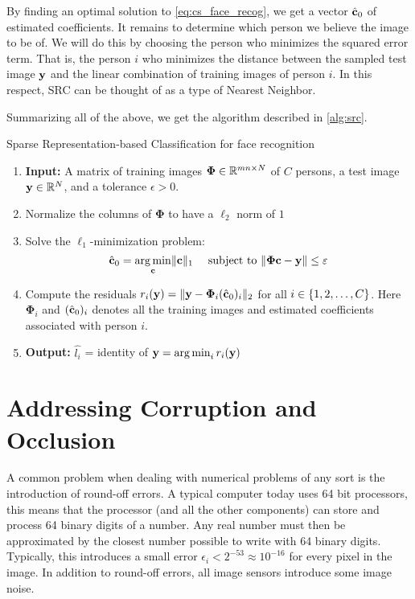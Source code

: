 By finding an optimal solution to \eqref{eq:cs_face_recog}, we get a vector $ \hat{\mathbf{c}}_{0} $ of estimated coefficients. It remains to determine which person we believe the image to be of. We will do this by choosing the person who minimizes the squared error term. That is, the person $ i $ who minimizes the distance between the sampled test image $ \mathbf{y} $ and the linear combination of training images of person $ i $. In this respect, SRC can be thought of as a type of Nearest Neighbor. 

Summarizing all of the above, we get the algorithm described in \cref{alg:src}. 



\begin{algorithm}[t]
	\caption{Sparse Representation-based Classification for face recognition}
	\label{alg:src}
	\begin{enumerate}
		\itemsep0em 
		\renewcommand{\parsep}{0pt}
		\renewcommand{\parskip}{0pt}
		\renewcommand{\itemsep}{0pt}
		\item[] \textbf{Input:} A matrix of training images $ \mathbf{\Phi} \in \mathbb{R}^{mn\times N} $ of $ C $ persons, a test image $ \mathbf{y}\in\mathbb{R}^{N} $, and a tolerance $ \epsilon > 0 $.
		\item Normalize the columns of $ \mathbf{\Phi} $ to have a $ \ell_{2} $ norm of $ 1 $
		\item Solve the $ \ell_{1} $-minimization problem:
		\[
			\hat{\mathbf{c}}_{0} = \operatorname*{arg\,min}_{\mathbf{c}} \lVert\mathbf{c}\rVert_{1} ~\quad\text{subject to}~ \lVert\mathbf{\Phi}\mathbf{c} - \mathbf{y}\rVert \leq \varepsilon
		\]
		\item Compute the residuals $ r_{i}(\mathbf{y}) = \lVert\mathbf{y} - \mathbf{\Phi}_{i}(\hat{\mathbf{c}}_{0})_{i}\rVert_{2} $ for all $ i \in \{1, 2, \ldots, C\} $. Here $ \mathbf{\Phi}_{i} $ and $ (\hat{\mathbf{c}}_{0})_{i} $ denotes all the training images and estimated coefficients associated with person $ i $. 
		\item[] \textbf{Output:} $ \hat{l_{i}} $ = identity of $ \mathbf{y} = \operatorname*{arg\,min}_{i} r_{i}(\mathbf{y}) $  
	\end{enumerate}
\end{algorithm}


\section{Addressing Corruption and Occlusion}
A common problem when dealing with numerical problems of any sort is the introduction of round-off errors. A typical computer today uses 64 bit processors, this means that the processor (and all the other components) can store and process 64 binary digits of a number. Any real number must then be approximated by the closest number possible to write with 64 binary digits. Typically, this introduces a small error $ \epsilon_{i} < 2^{-53} \approx 10^{-16} $ for every pixel in the image. In addition to round-off errors, all image sensors introduce some image noise. 

